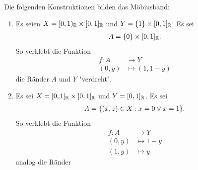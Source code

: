 \documentclass{report}
\begin{document}
\begin{definition}
	Die folgenden Konstruktionen bilden das Möbiusband:
	\begin{enumerate}
		\item Es seien $X = [0,1)_{\mathbb{R}} \times [0,1]_{\mathbb{R}}$ und $Y = \qty{1} \times [0,1]_{\mathbb{R}}$. Es sei
		\begin{align*}
			A = \qty{0} \times [0,1]_{\mathbb{R}}.
		\end{align*}
		So verklebt die Funktion
		\begin{align*}
			f : A &\to Y\\
			(0,y) &\mapsto (1,1-y)
		\end{align*}
		die Ränder $A$ und $Y$ "verdreht".
		\item Es sei $X = [0,1]_{\mathbb{R}} \times [0,1]_{\mathbb{R}}$ und $Y = [0,1]_{\mathbb{R}}$. Es sei
		\begin{align*}
			A = \qty{(x,z) \in X : x = 0 \vee x = 1}.
		\end{align*}
		So verklebt die Funktion
		\begin{align*}
			f : A &\to Y\\
			(0,y) &\mapsto 1-y\\
			(1,y) &\mapsto y
		\end{align*}
		analog die Ränder
	\end{enumerate}
\end{definition}
\end{document}
